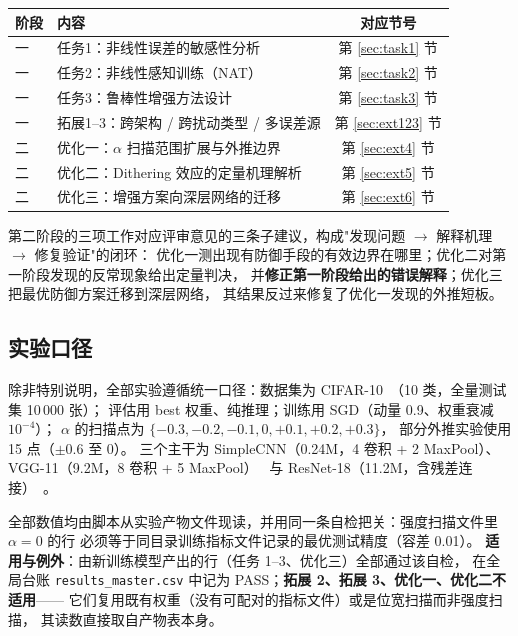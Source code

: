 \documentclass[11pt,a4paper]{ctexart}
\begin{document}
\begin{center}
\small
\begin{tabular}{llc}
\toprule
阶段 & 内容 & 对应节号 \\
\midrule
一 & 任务1：非线性误差的敏感性分析 & 第 \ref{sec:task1} 节 \\
一 & 任务2：非线性感知训练（NAT） & 第 \ref{sec:task2} 节 \\
一 & 任务3：鲁棒性增强方法设计 & 第 \ref{sec:task3} 节 \\
一 & 拓展1--3：跨架构 / 跨扰动类型 / 多误差源 & 第 \ref{sec:ext123} 节 \\
\midrule
二 & 优化一：$\alpha$ 扫描范围扩展与外推边界 & 第 \ref{sec:ext4} 节 \\
二 & 优化二：Dithering 效应的定量机理解析 & 第 \ref{sec:ext5} 节 \\
二 & 优化三：增强方案向深层网络的迁移 & 第 \ref{sec:ext6} 节 \\
\bottomrule
\end{tabular}
\end{center}

第二阶段的三项工作对应评审意见的三条子建议，构成"发现问题 $\to$ 解释机理 $\to$ 修复验证"的闭环：
优化一测出现有防御手段的有效边界在哪里；优化二对第一阶段发现的反常现象给出定量判决，
并\textbf{修正第一阶段给出的错误解释}；优化三把最优防御方案迁移到深层网络，
其结果反过来修复了优化一发现的外推短板。

\subsection{实验口径}

除非特别说明，全部实验遵循统一口径：数据集为 CIFAR-10~\cite{cifar}（10 类，全量测试集 10\,000 张）；
评估用 best 权重、纯推理；训练用 SGD（动量 0.9、权重衰减 $10^{-4}$）；
$\alpha$ 的扫描点为 $\{-0.3,-0.2,-0.1,0,+0.1,+0.2,+0.3\}$，
部分外推实验使用 15 点（$\pm0.6$ 至 $0$）。
三个主干为 SimpleCNN（0.24M，4 卷积 + 2 MaxPool）、
VGG-11（9.2M，8 卷积 + 5 MaxPool）~\cite{vgg}
与 ResNet-18（11.2M，含残差连接）~\cite{resnet}。

全部数值均由脚本从实验产物文件现读，并用同一条自检把关：强度扫描文件里 $\alpha=0$ 的行
必须等于同目录训练指标文件记录的最优测试精度（容差 0.01）。
\textbf{适用与例外}：由新训练模型产出的行（任务 1--3、优化三）全部通过该自检，
在全局台账 \texttt{results\_master.csv} 中记为 PASS；\textbf{拓展 2、拓展 3、优化一、优化二不适用}——
它们复用既有权重（没有可配对的指标文件）或是位宽扫描而非强度扫描，
其读数直接取自产物表本身。
\end{document}

